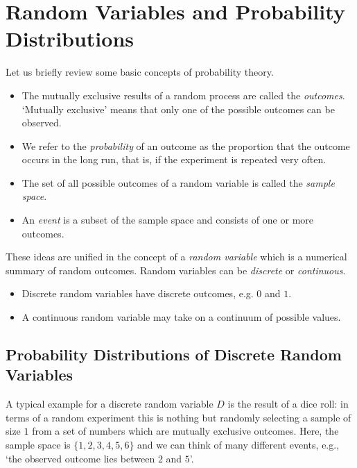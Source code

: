 \documentclass[]{book}
\providecommand{\tightlist}{%
  \setlength{\itemsep}{0pt}\setlength{\parskip}{0pt}}
\theoremstyle{definition}
\theoremstyle{definition}
\theoremstyle{definition}
\theoremstyle{remark}
\begin{document}
\section{Random Variables and Probability
Distributions}\label{random-variables-and-probability-distributions}

Let us briefly review some basic concepts of probability theory.

\begin{itemize}
\tightlist
\item
  The mutually exclusive results of a random process are called the
  \emph{outcomes}. `Mutually exclusive' means that only one of the
  possible outcomes can be observed.
\item
  We refer to the \emph{probability} of an outcome as the proportion
  that the outcome occurs in the long run, that is, if the experiment is
  repeated very often.
\item
  The set of all possible outcomes of a random variable is called the
  \emph{sample space}.
\item
  An \emph{event} is a subset of the sample space and consists of one or
  more outcomes.
\end{itemize}

These ideas are unified in the concept of a \emph{random variable} which
is a numerical summary of random outcomes. Random variables can be
\emph{discrete} or \emph{continuous}.

\begin{itemize}
\tightlist
\item
  Discrete random variables have discrete outcomes, e.g. \(0\) and
  \(1\).
\item
  A continuous random variable may take on a continuum of possible
  values.
\end{itemize}

\subsection*{Probability Distributions of Discrete Random
Variables}\label{probability-distributions-of-discrete-random-variables}

A typical example for a discrete random variable \(D\) is the result of
a dice roll: in terms of a random experiment this is nothing but
randomly selecting a sample of size \(1\) from a set of numbers which
are mutually exclusive outcomes. Here, the sample space is
\(\{1,2,3,4,5,6\}\) and we can think of many different events, e.g.,
`the observed outcome lies between \(2\) and \(5\)'.
\end{document}
